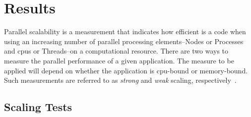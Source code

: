 \documentclass[10pt,journal,compsoc]{IEEEtran}
\begin{document}



















\section{Results}

Parallel scalability is a measurement that indicates how efficient is a code when using an increasing number of parallel processing elements--Nodes or Processes and \glspl{cpu} or Threads--on a computational resource. There are two ways to measure the parallel performance of a given application. The measure to be applied will depend on whether the application is \gls{cpu}-bound or memory-bound. Such measurements are referred to as \emph{strong} and \emph{weak} scaling, respectively~\cite{noauthor_measuring_nodate}.
















\subsection{ Scaling Tests}
\end{document}
